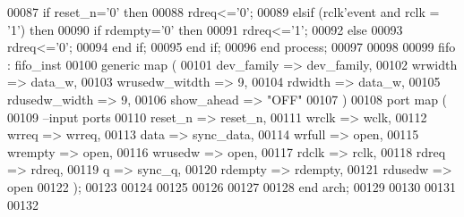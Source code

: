 \begin{DoxyCode}
00087       \textcolor{keywordflow}{if} \textcolor{vhdlchar}{reset_n}\textcolor{vhdlchar}{=}\textcolor{vhdlchar}{'}\textcolor{vhdllogic}{}\textcolor{vhdllogic}{0}\textcolor{vhdlchar}{'} \textcolor{keywordflow}{then}
00088         \textcolor{vhdlchar}{rdreq}\textcolor{vhdlchar}{<=}\textcolor{vhdlchar}{'}\textcolor{vhdllogic}{}\textcolor{vhdllogic}{0}\textcolor{vhdlchar}{'};  
00089         \textcolor{keywordflow}{elsif} \textcolor{vhdlchar}{(}\textcolor{vhdlchar}{rclk}\textcolor{vhdlchar}{'}\textcolor{vhdlkeyword}{event} \textcolor{keywordflow}{and} \textcolor{vhdlchar}{rclk} \textcolor{vhdlchar}{=} \textcolor{vhdlchar}{'}\textcolor{vhdllogic}{}\textcolor{vhdllogic}{1}\textcolor{vhdlchar}{'}\textcolor{vhdlchar}{)} \textcolor{keywordflow}{then}
00090           \textcolor{keywordflow}{if} \textcolor{vhdlchar}{rdempty}\textcolor{vhdlchar}{=}\textcolor{vhdlchar}{'}\textcolor{vhdllogic}{}\textcolor{vhdllogic}{0}\textcolor{vhdlchar}{'} \textcolor{keywordflow}{then} 
00091               \textcolor{vhdlchar}{rdreq}\textcolor{vhdlchar}{<=}\textcolor{vhdlchar}{'}\textcolor{vhdllogic}{}\textcolor{vhdllogic}{1}\textcolor{vhdlchar}{'};
00092           \textcolor{keywordflow}{else} 
00093               \textcolor{vhdlchar}{rdreq}\textcolor{vhdlchar}{<=}\textcolor{vhdlchar}{'}\textcolor{vhdllogic}{}\textcolor{vhdllogic}{0}\textcolor{vhdlchar}{'};
00094           \textcolor{keywordflow}{end} \textcolor{keywordflow}{if};
00095         \textcolor{keywordflow}{end} \textcolor{keywordflow}{if};
00096     \textcolor{keywordflow}{end} \textcolor{keywordflow}{process};
00097 
00098 
00099 fifo :  fifo_inst 
00100   \textcolor{keywordflow}{generic} \textcolor{keywordflow}{map} (
00101             dev_family      => dev_family, 
00102             wrwidth         => data_w, 
00103             wrusedw_witdth  => \textcolor{vhdllogic}{9}, 
00104             rdwidth         => data_w, 
00105             rdusedw_width   => \textcolor{vhdllogic}{9},
00106             show_ahead      => \textcolor{keyword}{"OFF"}
00107   \textcolor{vhdlchar}{)}  
00108   \textcolor{keywordflow}{port} \textcolor{keywordflow}{map} (
00109 \textcolor{keyword}{      --input ports }
00110       reset_n       => reset_n, 
00111       wrclk         => wclk,
00112       wrreq         => wrreq,
00113       data          => sync_data, 
00114       wrfull        => \textcolor{keywordflow}{open},
00115         wrempty       => \textcolor{keywordflow}{open}, 
00116       wrusedw       => \textcolor{keywordflow}{open},
00117       rdclk          => rclk,
00118       rdreq         => rdreq,
00119       q             => sync_q,
00120       rdempty       => rdempty,
00121       rdusedw       => \textcolor{keywordflow}{open}     
00122         \textcolor{vhdlchar}{)};
00123 
00124 
00125     
00126     
00127   
00128 \textcolor{keywordflow}{end} \textcolor{vhdlchar}{arch};   
00129 
00130 
00131 
00132 
\end{DoxyCode}
